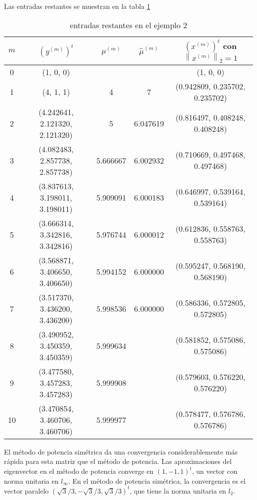 \documentclass{report}
\numberwithin{subsection}{section} %
\begin{document}
    Las entradas restantes se muestran en la tabla \ref{tab:ej22}

    \begin{table}[h!]
        \centering
        \caption{entradas restantes en el ejemplo 2}
        \label{tab:ej22}
        \begin{tabular}{|ccccc|} \hline
            $m$ & $(y^{(m)})^t$ & $\mu^{(m)}$ & $\hat{\mu}^{(m)}$ & $(x^{(m)})^t$ con $\left\|x^{(m)}\right\|_{2} = 1$ \\ \hline
            0  &  (1, 0, 0) & & & (1, 0, 0)  \\
            1  &  (4, 1, 1)                       &  4         & 7          &(0.942809, 0.235702, 0.235702) \\
            2  &  (4.242641, 2.121320, 2.121320)  &  5         &  6.047619  &(0.816497, 0.408248, 0.408248) \\
            3  &  (4.082483, 2.857738, 2.857738)  &  5.666667  &  6.002932  &(0.710669, 0.497468, 0.497468) \\
            4  &  (3.837613, 3.198011, 3.198011)  &  5.909091  &  6.000183  &(0.646997, 0.539164, 0.539164) \\
            5  &  (3.666314, 3.342816, 3.342816)  &  5.976744  &  6.000012  &(0.612836, 0.558763, 0.558763) \\
            6  &  (3.568871, 3.406650, 3.406650)  &  5.994152  &  6.000000  &(0.595247, 0.568190, 0.568190) \\
            7  &  (3.517370, 3.436200, 3.436200)  &  5.998536  &  6.000000  &(0.586336, 0.572805, 0.572805) \\
            8  &  (3.490952, 3.450359, 3.450359)  &  5.999634  &            &(0.581852, 0.575086, 0.575086) \\
            9  &  (3.477580, 3.457283, 3.457283)  &  5.999908  &            &(0.579603, 0.576220, 0.576220) \\
            10 &  (3.470854, 3.460706, 3.460706)  &  5.999977  &            &(0.578477, 0.576786, 0.576786) \\ \hline
        \end{tabular}
    \end{table}

    El método de potencia simétrica da una convergencia considerablemente más rápida para esta matriz que el método de potencia. Las aproximaciones del eigenvector en el método de potencia converge en $(1,-1, 1)^t$, un vector con norma unitaria en $l_{\infty}$. En el método de potencia simétrica, la convergencia es el vector paralelo $(\sqrt{3}/3, -\sqrt{3}/3, \sqrt{3}/3)^t$, que tiene la norma unitaria en $l_2$.
\end{document}

